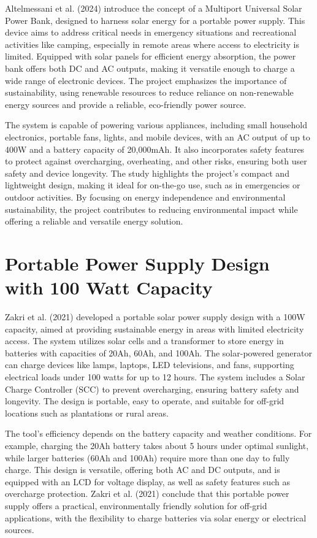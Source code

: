 {Altelmessani et al. (2024) introduce the concept of a Multiport Universal Solar Power Bank, designed to harness solar energy for a portable power supply. This device aims to address critical needs in emergency situations and recreational activities like camping, especially in remote areas where access to electricity is limited. Equipped with solar panels for efficient energy absorption, the power bank offers both DC and AC outputs, making it versatile enough to charge a wide range of electronic devices. The project emphasizes the importance of sustainability, using renewable resources to reduce reliance on non-renewable energy sources and provide a reliable, eco-friendly power source.

The system is capable of powering various appliances, including small household electronics, portable fans, lights, and mobile devices, with an AC output of up to 400W and a battery capacity of 20,000mAh. It also incorporates safety features to protect against overcharging, overheating, and other risks, ensuring both user safety and device longevity. The study highlights the project’s compact and lightweight design, making it ideal for on-the-go use, such as in emergencies or outdoor activities. By focusing on energy independence and environmental sustainability, the project contributes to reducing environmental impact while offering a reliable and versatile energy solution.

\section{Portable Power Supply Design with 100 Watt Capacity}

Zakri et al. (2021) developed a portable solar power supply design with a 100W capacity, aimed at providing sustainable energy in areas with limited electricity access. The system utilizes solar cells and a transformer to store energy in batteries with capacities of 20Ah, 60Ah, and 100Ah. The solar-powered generator can charge devices like lamps, laptops, LED televisions, and fans, supporting electrical loads under 100 watts for up to 12 hours. The system includes a Solar Charge Controller (SCC) to prevent overcharging, ensuring battery safety and longevity. The design is portable, easy to operate, and suitable for off-grid locations such as plantations or rural areas.

The tool's efficiency depends on the battery capacity and weather conditions. For example, charging the 20Ah battery takes about 5 hours under optimal sunlight, while larger batteries (60Ah and 100Ah) require more than one day to fully charge. This design is versatile, offering both AC and DC outputs, and is equipped with an LCD for voltage display, as well as safety features such as overcharge protection. Zakri et al. (2021) conclude that this portable power supply offers a practical, environmentally friendly solution for off-grid applications, with the flexibility to charge batteries via solar energy or electrical sources.

}
